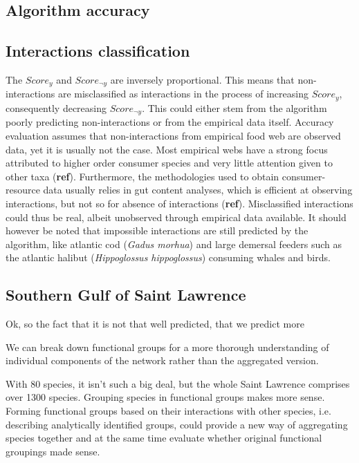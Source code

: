 \documentclass[letterpaper]{article}
\begin{document}
\subsection{Algorithm accuracy}




\subsection{Interactions classification}
The $Score_{y}$ and $Score_{\neg y}$ are inversely proportional. This means that non-interactions are misclassified as interactions in the process of increasing $Score_y$, consequently decreasing $Score_{\neg y}$. This could either stem from the algorithm poorly predicting non-interactions or from the empirical data itself. Accuracy evaluation assumes that non-interactions from empirical food web are observed data, yet it is usually not the case. Most empirical webs have a strong focus attributed to higher order consumer species and very little attention given to other taxa (\textbf{ref}). Furthermore, the methodologies used to obtain consumer-resource data usually relies in gut content analyses, which is efficient at observing interactions, but not so for absence of interactions (\textbf{ref}). Misclassified interactions could thus be real, albeit unobserved through empirical data available. It should however be noted that impossible interactions are still predicted by the algorithm, like atlantic cod (\textit{Gadus morhua}) and large demersal feeders such as the atlantic halibut (\textit{Hippoglossus hippoglossus}) consuming whales and birds.

\subsection{Southern Gulf of Saint Lawrence}



Ok, so the fact that it is not that well predicted, that we predict more

We can break down functional groups for a more thorough understanding of individual components of the network rather than the aggregated version.

With 80 species, it isn't such a big deal, but the whole Saint Lawrence comprises over 1300 species. Grouping species in functional groups makes more sense. Forming functional groups based on their interactions with other species, i.e. describing analytically identified groups, could provide a new way of aggregating species together and at the same time evaluate whether original functional groupings made sense.
\end{document}
